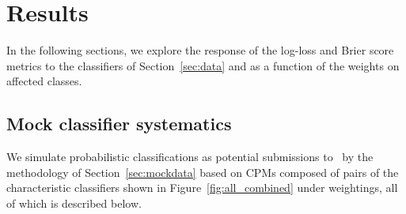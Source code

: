 \section{Results}
\label{sec:results}

In the following sections, we explore the response of the log-loss and Brier score metrics to the classifiers of Section~\ref{sec:data} and as a function of the weights on affected classes.

\subsection{Mock classifier systematics}
\label{sec:mockresults}

We simulate probabilistic classifications as potential submissions to \plasticc\ by the methodology of Section~\ref{sec:mockdata} based on CPMs composed of pairs of the characteristic classifiers shown in Figure~\ref{fig:all_combined} under weightings, all of which is described below.

